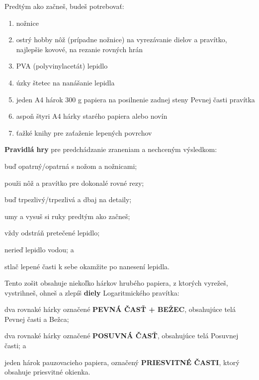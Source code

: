   \begin{multicols*}{3}
  \normalsize{Predtým ako začneš, budeš potrebovať:
    \begin{enumerate}
      \setlength{\parskip}{0pt}
      \setlength{\parsep}{0pt}
      \item nožnice
      \item ostrý hobby nôž (prípadne nožnice) na vyrezávanie dielov a pravítko, najlepšie kovové, na rezanie rovných hrán
      \item PVA (polyvinylacetát) lepidlo
      \item úzky štetec na nanášanie lepidla
      \item jeden A4 hárok 300 g papiera na posilnenie zadnej steny Pevnej časti pravítka
      \item aspoň štyri A4 hárky starého papiera alebo novín
      \item ťažké knihy pre zaťaženie lepených povrchov
    \end{enumerate}

  \textbf{Pravidlá hry} pre predchádzanie zraneniam a nechceným výsledkom:
    \begin{inparaenum}
      \item buď opatrný/opatrná s nožom a nožnicami;
      \item použi nôž a pravítko pre dokonalé rovné rezy;
      \item buď trpezlivý/trpezlivá a dbaj na detaily;
      \item umy a vysuš si ruky predtým ako začneš;
      \item vždy odstráň pretečené lepidlo;
      \item nerieď lepidlo vodou; a
      \item stlač lepené časti k sebe okamžite po nanesení lepidla.
    \end{inparaenum}

  Tento zošit obsahuje niekoľko hárkov hrubého papiera, z ktorých vyrežeš, vystrihneš, ohneš a zlepíš \textbf{diely} Logaritmického pravítka:
    \begin{inparaenum}
      \item dva rovnaké hárky označené \textbf{PEVNÁ ČASŤ + BEŽEC}, obsahujúce telá Pevnej časti a Bežca;
      \item dva rovnaké hárky označené \textbf{POSUVNÁ ČASŤ}, obsahujúce telá Posuvnej časti; a
      \item jeden hárok pauzovacieho papiera, označený \textbf{PRIESVITNÉ ČASTI}, ktorý obsahuje priesvitné okienka.
    \end{inparaenum}

}
\end{multicols*}
